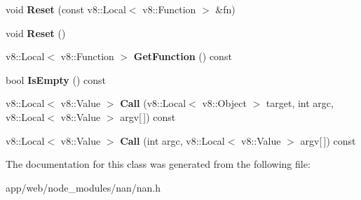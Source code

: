 \begin{DoxyCompactItemize}
\item 
\mbox{\label{class_nan_1_1_callback_aa50bb9a377502c3747f26547ce48268f}} 
void {\bfseries Reset} (const v8\+::\+Local$<$ v8\+::\+Function $>$ \&fn)
\item 
\mbox{\label{class_nan_1_1_callback_a5deb3325a6a93c239958145eb3d00a7f}} 
void {\bfseries Reset} ()
\item 
\mbox{\label{class_nan_1_1_callback_a0b734e33190a326e15397e850d8c0093}} 
v8\+::\+Local$<$ v8\+::\+Function $>$ {\bfseries Get\+Function} () const
\item 
\mbox{\label{class_nan_1_1_callback_a8b36fa12e6c9fcf4472dc117214707f6}} 
bool {\bfseries Is\+Empty} () const
\item 
\mbox{\label{class_nan_1_1_callback_a91783854d39a3896f96d808de45fa3c8}} 
v8\+::\+Local$<$ v8\+::\+Value $>$ {\bfseries Call} (v8\+::\+Local$<$ v8\+::\+Object $>$ target, int argc, v8\+::\+Local$<$ v8\+::\+Value $>$ argv\mbox{[}$\,$\mbox{]}) const
\item 
\mbox{\label{class_nan_1_1_callback_ab426a8a0dd76de9635b4e3225e9b4dee}} 
v8\+::\+Local$<$ v8\+::\+Value $>$ {\bfseries Call} (int argc, v8\+::\+Local$<$ v8\+::\+Value $>$ argv\mbox{[}$\,$\mbox{]}) const
\end{DoxyCompactItemize}


The documentation for this class was generated from the following file\+:\begin{DoxyCompactItemize}
\item 
app/web/node\+\_\+modules/nan/nan.\+h\end{DoxyCompactItemize}
